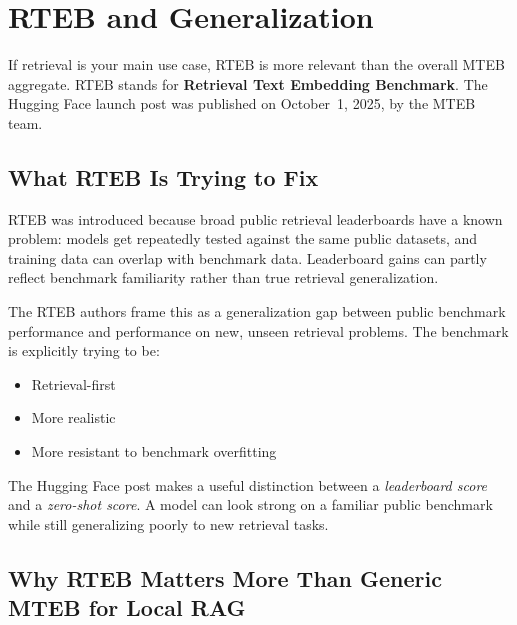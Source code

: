 \chapter{RTEB and Generalization}
\label{ch:rteb}

If retrieval is your main use case, RTEB is more relevant than the overall MTEB aggregate.
RTEB stands for \textbf{Retrieval Text Embedding Benchmark}. The Hugging Face launch post was
published on October~1, 2025, by the MTEB team.

\section{What RTEB Is Trying to Fix}

RTEB was introduced because broad public retrieval leaderboards have a known problem: models
get repeatedly tested against the same public datasets, and training data can overlap with
benchmark data. Leaderboard gains can partly reflect benchmark familiarity rather than true
retrieval generalization.

The RTEB authors frame this as a generalization gap between public benchmark performance and
performance on new, unseen retrieval problems. The benchmark is explicitly trying to be:

\begin{itemize}
    \item Retrieval-first
    \item More realistic
    \item More resistant to benchmark overfitting
\end{itemize}

The Hugging Face post makes a useful distinction between a \textit{leaderboard score} and a
\textit{zero-shot score}. A model can look strong on a familiar public benchmark while still
generalizing poorly to new retrieval tasks.

\section{Why RTEB Matters More Than Generic MTEB for Local RAG}

